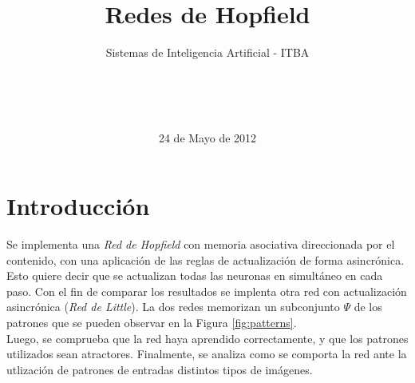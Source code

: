 \documentclass{sig-alternate}
\begin{document}

\title{Redes de Hopfield}
\subtitle{Sistemas de Inteligencia Artificial - ITBA}


\author{
	\\
	\\
	\\	
}

\date{24 de Mayo de 2012}

\maketitle

\section*{Introducción}
Se implementa una \textit{Red de Hopfield} con memoria asociativa direccionada por el contenido, con una aplicación de las reglas de actualización de forma asincrónica. Esto quiere decir que se actualizan todas las neuronas en simultáneo en cada paso. Con el fin de comparar los resultados se implenta otra red con actualización asincrónica (\textit{Red de Little}). La dos redes memorizan un subconjunto $\Psi$ de los patrones que se pueden observar en la Figura \ref{fig:patterns}.\\
Luego, se comprueba que la red haya aprendido correctamente, y que los patrones utilizados sean atractores. Finalmente, se analiza como se comporta la red ante la utlización de patrones de entradas distintos tipos de imágenes.\\
\end{document}
